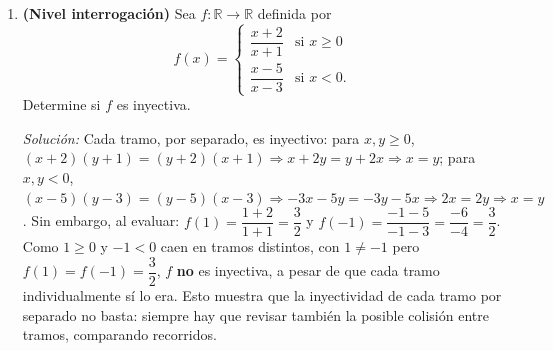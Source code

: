 \documentclass[11pt]{article}
\begin{document}
\begin{enumerate}[label=\arabic*.]
\textit{Solución:} Inyectividad en cada tramo (vía la definición): para $x,y\ge0$ con $f(x)=f(y)$,
$(x-1)(y+1)=(y-1)(x+1) \Rightarrow xy+x-y-1=xy+y-x-1 \Rightarrow 2x=2y \Rightarrow x=y$. Para $x,y<0$
con $f(x)=f(y)$, $(x-3)(y-1)=(y-3)(x-1) \Rightarrow xy-x-3y+3=xy-y-3x+3 \Rightarrow 2x=2y \Rightarrow
x=y$. Como los dominios $[0,\infty[$ y $\,]-\infty,0[$ ya son disjuntos, falta ver que los
recorridos de ambos tramos no se intersectan. Para $x\ge0$: $\dfrac{x-1}{x+1}=1-\dfrac{2}{x+1}$;
como $x+1\in[1,\infty[$, se tiene $\dfrac{2}{x+1}\in\,]0,2]$, luego $f(x)\in[-1,1[$. Para $x<0$:
$\dfrac{x-3}{x-1}=1-\dfrac{2}{x-1}$; como $x-1\in\,]-\infty,-1[$, se tiene
$\dfrac{2}{x-1}\in\,]-2,0[$, luego $f(x)\in\,]1,3[$. Como $[-1,1[\,\cap\,]1,3[=\emptyset$, ningún
valor de un tramo coincide con uno del otro. Junto con la inyectividad dentro de cada tramo, $f$ es
inyectiva en $\mathbb{R}$.

\item \textbf{(Nivel interrogación)} Sea $f:\mathbb{R}\to\mathbb{R}$ definida por
\[
f(x) = \begin{cases} \dfrac{x+2}{x+1} & \text{si } x \ge 0 \\[2mm] \dfrac{x-5}{x-3} & \text{si } x < 0. \end{cases}
\]
Determine si $f$ es inyectiva.

\textit{Solución:} Cada tramo, por separado, es inyectivo: para $x,y\ge0$,
$(x+2)(y+1)=(y+2)(x+1) \Rightarrow x+2y=y+2x \Rightarrow x=y$; para $x,y<0$,
$(x-5)(y-3)=(y-5)(x-3) \Rightarrow -3x-5y=-3y-5x \Rightarrow 2x=2y \Rightarrow x=y$. Sin embargo, al
evaluar: $f(1)=\dfrac{1+2}{1+1}=\dfrac{3}{2}$ y $f(-1)=\dfrac{-1-5}{-1-3}=\dfrac{-6}{-4}=\dfrac{3}{2}$.
Como $1\ge0$ y $-1<0$ caen en tramos distintos, con $1\neq-1$ pero $f(1)=f(-1)=\dfrac32$, $f$
\textbf{no} es inyectiva, a pesar de que cada tramo individualmente sí lo era. Esto muestra que la
inyectividad de cada tramo por separado no basta: siempre hay que revisar también la posible
colisión entre tramos, comparando recorridos.

\end{enumerate}
\end{document}

